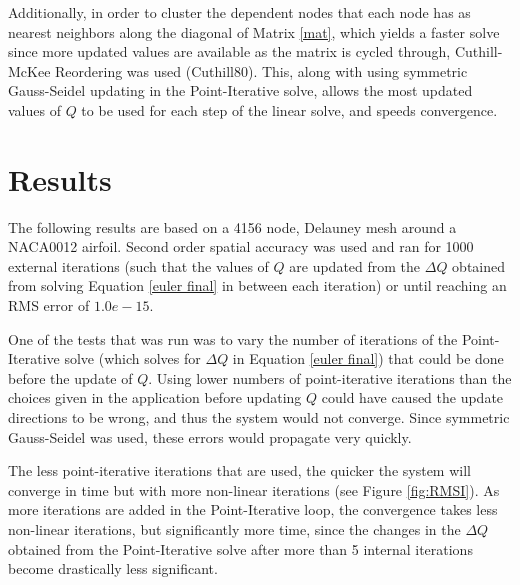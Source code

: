 \documentclass[letterpaper,twoside,11pt,openright,pdf]{book} %
\begin{document}
Additionally, in order to cluster the dependent nodes that each node has as nearest neighbors along the diagonal of Matrix \ref{mat}, which yields a faster solve since more updated values are available as the matrix is cycled through, Cuthill-McKee Reordering was used (Cuthill80).  This, along with using symmetric Gauss-Seidel updating in the Point-Iterative solve, allows the most updated values of \(Q\) to be used for each step of the linear solve, and speeds convergence.

\section{Results} 
The following results are based on a 4156 node, Delauney mesh around a NACA0012 airfoil.  Second order spatial accuracy was used and ran for 1000 external iterations (such that the values of \(Q\) are updated from the \(\Delta Q\) obtained from solving Equation \ref{euler final} in between each iteration) or until reaching an RMS error of \(1.0e-15\).

One of the tests that was run was to vary the number of iterations of the Point-Iterative solve (which solves for \(\Delta Q\) in Equation \ref{euler final}) that could be done before the update of \(Q\).  Using lower numbers of point-iterative iterations than the choices given in the application before updating \(Q\) could have caused the update directions to be wrong, and thus the system would not converge.  Since symmetric Gauss-Seidel was used, these errors would propagate very quickly.

The less point-iterative iterations that are used, the quicker the system will converge in time but with more non-linear iterations (see Figure \ref{fig:RMSI}).  As more iterations are added in the Point-Iterative loop, the convergence takes less non-linear iterations, but significantly more time, since the changes in the \(\Delta Q\) obtained from the Point-Iterative solve after more than 5 internal iterations become drastically less significant.
\end{document}
